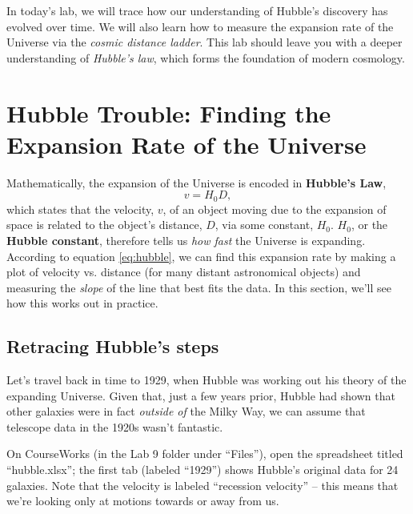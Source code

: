 \documentclass[11pt]{article}
\begin{document}
In today's lab, we will trace how our understanding of Hubble's discovery has evolved over time. We will also learn how to measure the expansion rate of the Universe via the \emph{cosmic distance ladder}. This lab should leave you with a deeper understanding of \emph{Hubble's law}, which forms the foundation of modern cosmology.

\section{Hubble Trouble: Finding the Expansion Rate of the Universe}

Mathematically, the expansion of the Universe is encoded in \textbf{Hubble's Law},
\begin{equation} \label{eq:hubble}
    v = H_0 D,
\end{equation}
which states that the velocity, $v$, of an object moving due to the expansion of space is related to the object's distance, $D$, via some constant, $H_0$. $H_0$, or the \textbf{Hubble constant}, therefore tells us \emph{how fast} the Universe is expanding. According to equation \ref{eq:hubble}, we can find this expansion rate by making a plot of velocity vs. distance (for many distant astronomical objects) and measuring the \emph{slope} of the line that best fits the data. In this section, we'll see how this works out in practice.


\subsection{Retracing Hubble's steps}

Let's travel back in time to 1929, when Hubble was working out his theory of the expanding Universe. Given that, just a few years prior, Hubble had shown that other galaxies were in fact \emph{outside of} the Milky Way, we can assume that telescope data in the 1920s wasn't fantastic. 

On CourseWorks (in the Lab 9 folder under ``Files''), open the spreadsheet titled ``hubble.xlsx''; the first tab (labeled ``1929'') shows Hubble's original data for 24 galaxies. Note that the velocity is labeled ``recession velocity'' -- this means that we're looking only at motions towards or away from us.
\end{document}
